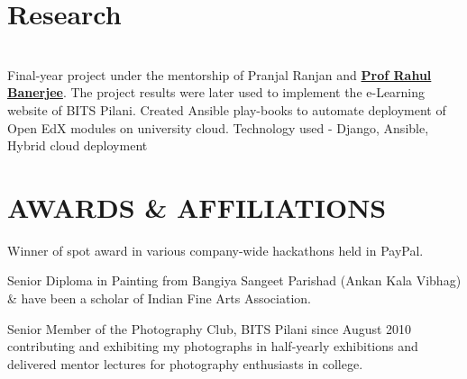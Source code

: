 \documentclass[]{deedy-resume-openfont}
\begin{document}
\begin{minipage}[t]{0.66\textwidth}

\section{Research}
\vspace{\topsep}
 \\
Final-year project under the mentorship of Pranjal Ranjan and \textbf{\href{http://www.cs.cornell.edu/~asaxena/}{Prof Rahul Banerjee}}. 
The project results were later used to implement the e-Learning website of BITS Pilani.
Created Ansible play-books to automate deployment of Open EdX modules on university cloud. Technology used - Django, Ansible, Hybrid cloud deployment
\sectionsep



\section{AWARDS \& AFFILIATIONS} 
\begin{tightemize}\vspace{\topsep}
\item Winner of spot award in various company-wide hackathons held in PayPal.
\item Senior Diploma in Painting from Bangiya Sangeet Parishad (Ankan Kala Vibhag) \& have been a scholar of Indian Fine Arts Association.
\item Senior Member of the Photography Club, BITS Pilani since August 2010 contributing and exhibiting my photographs in half-yearly exhibitions and delivered mentor lectures for photography enthusiasts in college.
\end{tightemize}
\sectionsep

\end{minipage}
\end{document}
